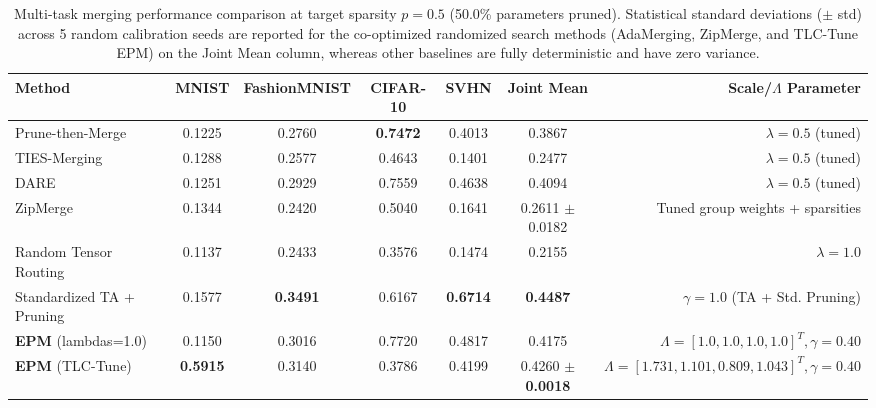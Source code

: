 \begin{table}[t]
\caption{Multi-task merging performance comparison at target sparsity $p=0.5$ (50.0\% parameters pruned). Statistical standard deviations ($\pm$ std) across 5 random calibration seeds are reported for the co-optimized randomized search methods (AdaMerging, ZipMerge, and TLC-Tune EPM) on the Joint Mean column, whereas other baselines are fully deterministic and have zero variance.}
\label{tab:results_p5}
\vskip 0.15in
\begin{center}
\begin{small}
\begin{sc}
\begin{tabular}{lcccccr}
\toprule
Method & MNIST & FashionMNIST & CIFAR-10 & SVHN & Joint Mean & Scale/$\Lambda$ Parameter \\
\midrule
Prune-then-Merge & 0.1225 & 0.2760 & \textbf{0.7472} & 0.4013 & 0.3867 & $\lambda=0.5$ (tuned) \\
TIES-Merging     & 0.1288 & 0.2577 & 0.4643 & 0.1401 & 0.2477 & $\lambda=0.5$ (tuned) \\
DARE             & 0.1251 & 0.2929 & 0.7559 & 0.4638 & 0.4094 & $\lambda=0.5$ (tuned) \\
ZipMerge         & 0.1344 & 0.2420 & 0.5040 & 0.1641 & 0.2611 $\pm$ 0.0182 & Tuned group weights + sparsities \\
Random Tensor Routing & 0.1137 & 0.2433 & 0.3576 & 0.1474 & 0.2155 & $\lambda=1.0$ \\
Standardized TA + Pruning & 0.1577 & \textbf{0.3491} & 0.6167 & \textbf{0.6714} & \textbf{0.4487} & $\gamma=1.0$ (TA + Std. Pruning) \\
\midrule
\textbf{EPM} (lambdas=1.0) & 0.1150 & 0.3016 & 0.7720 & 0.4817 & 0.4175 & $\Lambda=[1.0, 1.0, 1.0, 1.0]^T, \gamma=0.40$ \\
\textbf{EPM} (TLC-Tune)    & \textbf{0.5915} & 0.3140 & 0.3786 & 0.4199 & 0.4260 $\pm$ \textbf{0.0018} & $\Lambda=[1.731, 1.101, 0.809, 1.043]^T, \gamma=0.40$ \\
\bottomrule
\end{tabular}
\end{sc}
\end{small}
\end{center}
\vskip -0.1in
\end{table}

